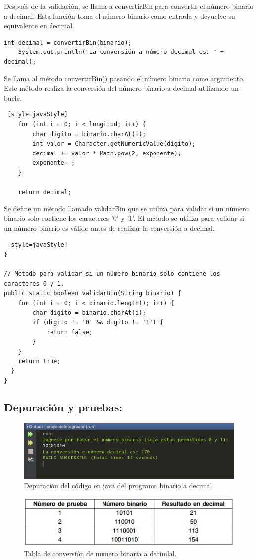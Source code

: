 Después de la validación, se llama a convertirBin para convertir el número binario a decimal. Esta función toma el número binario como entrada y devuelve su equivalente en decimal.
\begin{lstlisting}[style=javaStyle] 
    int decimal = convertirBin(binario);
    System.out.println("La conversión a número decimal es: " + decimal);
\end{lstlisting}
Se llama al método convertirBin() pasando el número binario como argumento. Este método realiza la conversión del número binario a decimal utilizando un bucle.
\begin{lstlisting} [style=javaStyle] 
    for (int i = 0; i < longitud; i++) {
        char digito = binario.charAt(i);
        int valor = Character.getNumericValue(digito);
        decimal += valor * Math.pow(2, exponente);
        exponente--;
    }

    return decimal;

\end{lstlisting}
Se define un método llamado validarBin que se utiliza para validar si un número binario solo contiene los caracteres '0' y '1'.  El método se utiliza para validar si un número binario es válido antes de realizar la conversión a decimal.
\begin{lstlisting} [style=javaStyle] 
}

// Metodo para validar si un número binario solo contiene los caracteres 0 y 1.
public static boolean validarBin(String binario) {
    for (int i = 0; i < binario.length(); i++) {
        char digito = binario.charAt(i);
        if (digito != '0' && digito != '1') {
            return false;
        }
    }
    return true;
  }
}
\end{lstlisting}

\subsection{\textbf{Depuración y pruebas:}}
\begin{figure}[h!]
    \centering
    \includegraphics[width = 7.5 cm]{LaTeX/latex-imagenes/fig.2.jpeg}
    \caption{Depuración del código en java del programa binario a decimal.}
    \label{fig:DepuraciónCodigo}
\end{figure}

\begin{figure}[h!]
    \centering
    \includegraphics[width = 7.5 cm]{LaTeX/latex-imagenes/fig.3.jpeg}
    \caption{Tabla de conversión de numero binaria a decimlal.}
    \label{fig:DepuraciónCodigo}
\end{figure}